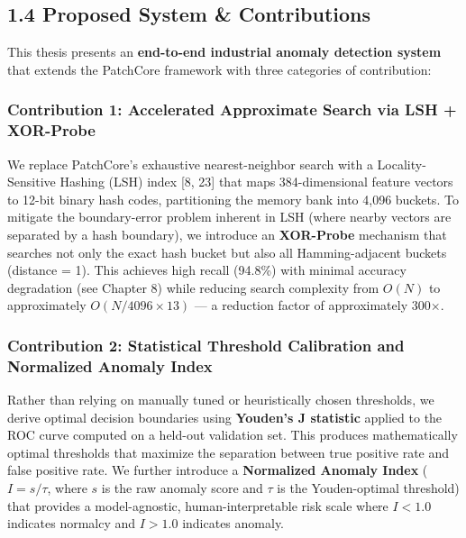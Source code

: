 \documentclass[12pt, a4paper, oneside]{report}
\begin{document}
\subsection{1.4 Proposed System \& Contributions}\label{proposed-system-contributions}

This thesis presents an \textbf{end-to-end industrial anomaly detection system} that extends the PatchCore framework with three categories of contribution:

\subsubsection{Contribution 1: Accelerated Approximate Search via LSH + XOR-Probe}\label{contribution-1-accelerated-approximate-search-via-lsh-xor-probe}

We replace PatchCore's exhaustive nearest-neighbor search with a Locality-Sensitive Hashing (LSH) index {[}8, 23{]} that maps 384-dimensional feature vectors to 12-bit binary hash codes, partitioning the memory bank into 4,096 buckets. To mitigate the boundary-error problem inherent in LSH (where nearby vectors are separated by a hash boundary), we introduce an \textbf{XOR-Probe} mechanism that searches not only the exact hash bucket but also all Hamming-adjacent buckets (distance = 1). This achieves high recall (94.8\%) with minimal accuracy degradation (see Chapter 8) while reducing search complexity from \(O(N)\) to approximately \(O(N/4096 \times 13)\) --- a reduction factor of approximately 300$\times$.

\subsubsection{Contribution 2: Statistical Threshold Calibration and Normalized Anomaly Index}\label{contribution-2-statistical-threshold-calibration-and-normalized-anomaly-index}

Rather than relying on manually tuned or heuristically chosen thresholds, we derive optimal decision boundaries using \textbf{Youden's J statistic} applied to the ROC curve computed on a held-out validation set. This produces mathematically optimal thresholds that maximize the separation between true positive rate and false positive rate. We further introduce a \textbf{Normalized Anomaly Index} (\(I = s / \tau\), where \(s\) is the raw anomaly score and \(\tau\) is the Youden-optimal threshold) that provides a model-agnostic, human-interpretable risk scale where \(I < 1.0\) indicates normalcy and \(I > 1.0\) indicates anomaly.
\end{document}
